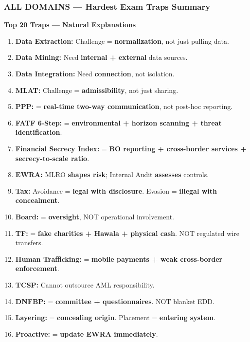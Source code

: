 \documentclass[12pt,aspectratio=169]{beamer}
\renewcommand{\scriptsize}{\fontsize{4.5}{5.5}\selectfont}
\begin{document}
	\begin{frame}
		\frametitle{\fontsize{11}{13}\selectfont \textbf{ALL DOMAINS — Hardest Exam Traps Summary}}
		\scriptsize
		\begin{block}{\fontsize{7}{9}\selectfont \textbf{Top 20 Traps — Natural Explanations}}
			\scriptsize
			\begin{enumerate}
				\item \textbf{Data Extraction:} Challenge = \textbf{normalization}, not just pulling data.
				\item \textbf{Data Mining:} Need \textbf{internal + external} data sources.
				\item \textbf{Data Integration:} Need \textbf{connection}, not isolation.
				\item \textbf{MLAT:} Challenge = \textbf{admissibility}, not just sharing.
				\item \textbf{PPP:} = \textbf{real-time two-way communication}, not post-hoc reporting.
				\item \textbf{FATF 6-Step:} = \textbf{environmental + horizon scanning + threat identification}.
				\item \textbf{Financial Secrecy Index:} = \textbf{BO reporting + cross-border services + secrecy-to-scale ratio}.
				\item \textbf{EWRA:} MLRO \textbf{shapes risk}; Internal Audit \textbf{assesses} controls.
				\item \textbf{Tax:} Avoidance = \textbf{legal with disclosure}. Evasion = \textbf{illegal with concealment}.
				\item \textbf{Board:} = \textbf{oversight}, NOT operational involvement.
				\item \textbf{TF:} = \textbf{fake charities + Hawala + physical cash}. NOT regulated wire transfers.
				\item \textbf{Human Trafficking:} = \textbf{mobile payments + weak cross-border enforcement}.
				\item \textbf{TCSP:} Cannot outsource AML responsibility.
				\item \textbf{DNFBP:} = \textbf{committee + questionnaires}. NOT blanket EDD.
				\item \textbf{Layering:} = \textbf{concealing origin}. Placement = \textbf{entering system}.
				\item \textbf{Proactive:} = \textbf{update EWRA immediately}.

\end{enumerate}
\end{block}
\end{frame}
\end{document}
